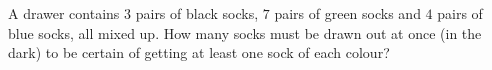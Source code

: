 A drawer contains $3$ pairs of black socks, $7$ pairs of green socks and $4$ pairs of blue socks, all mixed up. How many socks must be drawn out at once (in the dark) to be certain of getting at least one sock of each colour?
